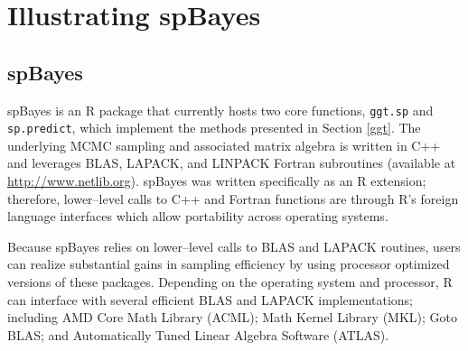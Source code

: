 \documentclass[a4paper]{article}
\let\code=\texttt
\let\proglang=\textsf
\newcommand{\pkg}[1]{{\normalfont\fontseries{b}\selectfont #1}}
\begin{document}
\section[Illustrating spBayes]{Illustrating \pkg{spBayes}}\label{Illustration}

\subsection[spBayes]{\pkg{spBayes}}\label{spBayes}
\pkg{spBayes} is an \proglang{R} package that currently hosts two core
functions,  \code{ggt.sp} and \code{sp.predict}, which implement
the methods presented in Section \ref{ggt}.  The underlying MCMC
sampling and associated matrix algebra is written in
\proglang{C++} and leverages \pkg{BLAS}, \pkg{LAPACK}, and
\pkg{LINPACK} \proglang{Fortran} subroutines (available at \url{http://www.netlib.org}).  \pkg{spBayes} was written specifically as an \proglang{R} extension; therefore,
lower--level calls to \proglang{C++} and \proglang{Fortran}
functions are through \proglang{R}'s foreign language interfaces which allow portability across operating systems.

Because \pkg{spBayes} relies on lower--level calls to \pkg{BLAS} and \pkg{LAPACK} routines, users can realize substantial gains in sampling efficiency by using processor optimized versions of these packages.  Depending on the operating system and processor, \proglang{R} can interface with several efficient \pkg{BLAS} and \pkg{LAPACK} implementations; including AMD Core Math Library (ACML); Math Kernel Library (MKL); Goto BLAS; and Automatically Tuned Linear Algebra Software (ATLAS).
\end{document}
